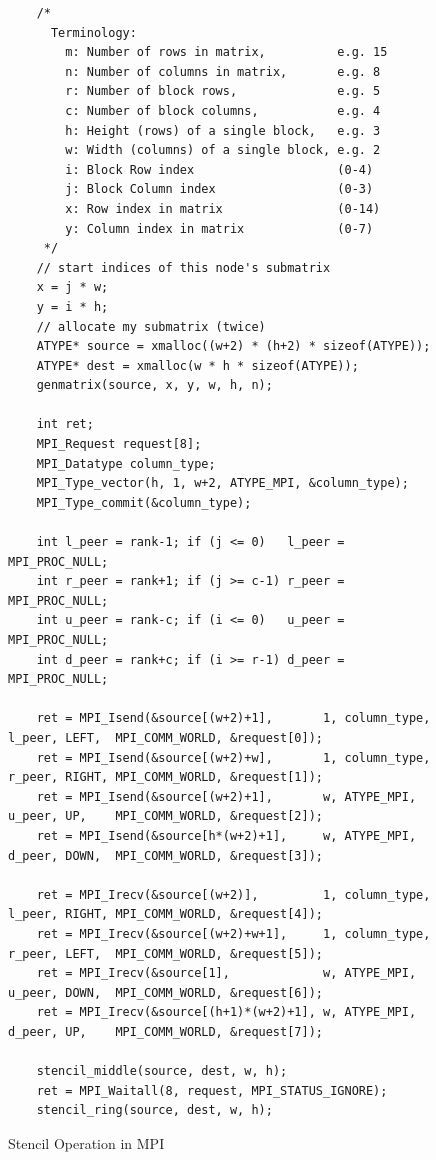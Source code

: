 \documentclass[11pt]{article}
\begin{document}
\begin{figure}[H]
\label{mpi_stencil_code}
\caption{Stencil Operation in MPI}
\begin{lstlisting}
	/*
	  Terminology:
		m: Number of rows in matrix,          e.g. 15
		n: Number of columns in matrix,       e.g. 8
		r: Number of block rows,              e.g. 5
		c: Number of block columns,           e.g. 4
		h: Height (rows) of a single block,   e.g. 3
		w: Width (columns) of a single block, e.g. 2
		i: Block Row index                    (0-4)
		j: Block Column index                 (0-3)
		x: Row index in matrix                (0-14)
		y: Column index in matrix             (0-7)
	 */
	// start indices of this node's submatrix
	x = j * w;
	y = i * h;
	// allocate my submatrix (twice)
	ATYPE* source = xmalloc((w+2) * (h+2) * sizeof(ATYPE));
	ATYPE* dest = xmalloc(w * h * sizeof(ATYPE));
	genmatrix(source, x, y, w, h, n);

	int ret;
	MPI_Request request[8];
	MPI_Datatype column_type;
	MPI_Type_vector(h, 1, w+2, ATYPE_MPI, &column_type);
	MPI_Type_commit(&column_type);

	int l_peer = rank-1; if (j <= 0)   l_peer = MPI_PROC_NULL;
	int r_peer = rank+1; if (j >= c-1) r_peer = MPI_PROC_NULL;
	int u_peer = rank-c; if (i <= 0)   u_peer = MPI_PROC_NULL;
	int d_peer = rank+c; if (i >= r-1) d_peer = MPI_PROC_NULL;

	ret = MPI_Isend(&source[(w+2)+1],       1, column_type, l_peer, LEFT,  MPI_COMM_WORLD, &request[0]);
	ret = MPI_Isend(&source[(w+2)+w],       1, column_type, r_peer, RIGHT, MPI_COMM_WORLD, &request[1]);
	ret = MPI_Isend(&source[(w+2)+1],       w, ATYPE_MPI,   u_peer, UP,    MPI_COMM_WORLD, &request[2]);
	ret = MPI_Isend(&source[h*(w+2)+1],     w, ATYPE_MPI,   d_peer, DOWN,  MPI_COMM_WORLD, &request[3]);

	ret = MPI_Irecv(&source[(w+2)],         1, column_type, l_peer, RIGHT, MPI_COMM_WORLD, &request[4]);
	ret = MPI_Irecv(&source[(w+2)+w+1],     1, column_type, r_peer, LEFT,  MPI_COMM_WORLD, &request[5]);
	ret = MPI_Irecv(&source[1],             w, ATYPE_MPI,   u_peer, DOWN,  MPI_COMM_WORLD, &request[6]);
	ret = MPI_Irecv(&source[(h+1)*(w+2)+1], w, ATYPE_MPI,   d_peer, UP,    MPI_COMM_WORLD, &request[7]);

	stencil_middle(source, dest, w, h);
	ret = MPI_Waitall(8, request, MPI_STATUS_IGNORE);
	stencil_ring(source, dest, w, h);

\end{lstlisting}
\end{figure}
\end{document}
